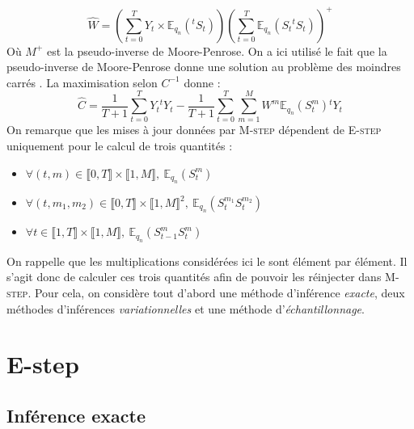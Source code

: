\documentclass[10pt,a4paper]{article}
\newcommand{\Estep}{\textsc{E-step}}
\newcommand{\Mstep}{\textsc{M-step}}
\begin{document}
\begin{equation}
  \widehat{W}=\left( \underset{t=0}{\overset{T}{\sum}} Y_t \times 
  \mathbb{E}_{q_n}({}^tS_t) \right) \left( \underset{t=0}{\overset{T}{\sum}} 
  \mathbb{E}_{q_n}\left( S_t {}^t S_t\right)\right)^+
\end{equation}
Où $M^+$ est la pseudo-inverse de Moore-Penrose. On a ici utilisé le fait que 
la pseudo-inverse de Moore-Penrose donne une solution au problème des moindres 
carrés \cite{ben2003generalized}. La maximisation selon $C^{-1}$ donne :
\begin{equation}
\widehat{C}=\frac{1}{T+1}\underset{t=0}{\overset{T}{\sum}}Y_t 
{}^tY_t-\frac{1}{T+1}\underset{t=0}{\overset{T}{\sum}}\underset{m=1}{\overset{M}
{\sum}}W^m\mathbb{E}_{q_n}(S_t^m){}^t Y_t
\end{equation}
On remarque que les mises à jour données par \Mstep{} dépendent de \Estep{} 
uniquement pour le calcul de trois quantités :
\begin{itemize}
\item $\forall (t,m) \in \llbracket 0, T\rrbracket \times \llbracket 1,M 
\rrbracket, \ \mathbb{E}_{q_n}(S_t^m) $
\item $\forall (t,m_1,m_2) \in \llbracket 0, T\rrbracket \times \llbracket 
1,M\rrbracket^2, \ \mathbb{E}_{q_n}(S_t^{m_1}S_t^{m_2}) $
\item $\forall t \in \llbracket 1,T \rrbracket \times \llbracket 1,M 
\rrbracket, \ \mathbb{E}_{q_n}(S_{t-1}^mS_t^{m})$
\end{itemize}
On rappelle que les multiplications considérées ici le sont élément par 
élément. Il s'agit donc de calculer ces trois quantités afin de pouvoir les 
réinjecter dans \Mstep. Pour cela, on considère tout d'abord une méthode
d'inférence \emph{exacte}, deux méthodes d'inférences \emph{variationnelles} et
une méthode d'\emph{échantillonnage}.

\section{E-step}

\subsection{Inférence exacte}
\end{document}
